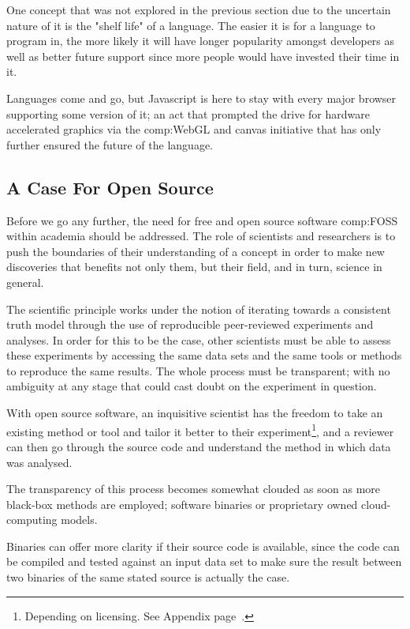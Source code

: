 One concept that was not explored in the previous section due to the uncertain nature of it is the "shelf life" of a language. The easier it is for a language to program in, the more likely it will have longer popularity amongst  developers as well as better future support since more people would have invested their time in it. 

Languages come and go, but Javascript is here to stay with every major browser supporting some version of it; an act that prompted the drive for hardware accelerated graphics via the \gls{comp:WebGL} and canvas initiative that has only further ensured the future of the language.


\subsection{A Case For Open Source}


Before we go any further, the need for free and open source software \gls{comp:FOSS} within academia should be addressed. The role of scientists and researchers is to push the boundaries of their understanding of a concept in order to make new discoveries that benefits not only them, but their field, and in turn, science in general. 

The scientific principle works under the notion of iterating towards a consistent truth model through the use of reproducible peer-reviewed experiments and analyses.  In order for this to be the case, other scientists must be able to assess these experiments by accessing the same data sets and the same tools or methods to reproduce the same results. The whole process must be transparent; with no ambiguity at any stage that could cast doubt on the experiment in question.

With open source software, an inquisitive scientist has the freedom to take an existing method or tool and tailor it better to their experiment\footnote{Depending on licensing. See Appendix page~\pageref{ref:app:licensing}.}, and a reviewer can then go through the source code and understand the method in which data was analysed.

The transparency of this process becomes somewhat clouded as soon as more black-box methods are employed; software binaries or proprietary owned cloud-computing models.

Binaries can offer more clarity if their source code is available, since the code can be compiled and tested against an input data set to make sure the result between two binaries of the same stated source is actually the case.

